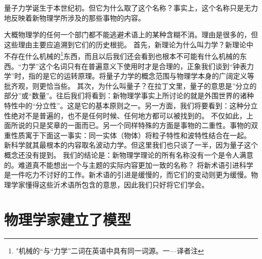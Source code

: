 量子力学诞生于本世纪初。但它为什么取了这个名称？事实上，这个名称只是无力地反映着新物理学所涉及的那些事物的内容。

大概物理学的任何一个部门都不能逃避术语上的某种含糊不消。理由是很多的，但这些理由主要应追溯到它们的历史根扼。
首先，新理论为什么叫力学？新理论中不存在什么机械的\footnote{"机械的“与“力学”二词在英语中具有同一词源。一—译者注}东西，而且以后我们还会看到也根本不可能有什么机械的东西。“力学”这个名词只有在普遍意义下使用时才是合理的，正象我们谈到“钟表力学”时，指的是它的运转原理。将量子力学的概念范围与物理学本身的广阔定义等批齐观，则更恰当些。
其次，为什么叫量子？在拉丁文里，量子的意思是”分立的部分”或“数量”。往后我们将看到：新物理学事实上所讨论的就是外围世界的诸种特性中的“分立性”。这是它的基本原则之一。另一方面，我们将要看到：这种分立性绝对不是普遍的，也不是任何时候、任何地方都可以被找到的。
不仅如此，上面所说的只是奖章的一面而已。另一个同样特殊的方面是事物的二重性。事物的双重性质寓于下面这一事实：同一实体（物体）将粒子特性和波特性结合在一起。
新科学就其最根本的内容取名波动力学。但这里我们也只谈了一半，因为量子这个概念还没有提到。
我们的结论是：新物理学理论的所有名称没有一个是令人满意的。难道真不能想出一个与主题的实际内容更加一致的名称？
将新术语引进科学是一件吃力不讨好的工作。新术语的引进是缓慢的，而它们的变动则更为缓慢。物理学家懂得这些沂术语所包含的意思，因此我们只好将它们学会。

\section{物理学家建立了模型}

